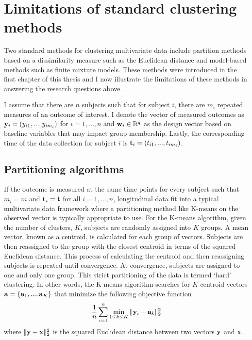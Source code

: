 \section{Limitations of standard clustering methods}
Two standard methods for clustering multivariate data include partition methods based on a dissimilarity measure such as the Euclidean distance and model-based methods such as finite mixture models. These methods were introduced in the first chapter of this thesis and I now illustrate the limitations of these methods in answering the research questions above. 

I assume that there are $n$ subjects such that for subject $i$, there are $m_{i}$ repeated measures of an outcome of interest. I denote the vector of measured outcomes as $\mathbf y_{i}=(y_{i1},...,y_{im_{i}})$ for $i=1,...,n$ and $\mathbf w_{i}\in \mathbb{R}^{q}$ as the design vector based on baseline variables that may impact group membership. Lastly, the corresponding time of the data collection for subject $i$ is $\mathbf t_{i}=(t_{i1},...,t_{im_{i}})$. 

\subsection{Partitioning algorithms}
If the outcome is measured at the same time points for every subject such that $m_{i}=m$ and $\mathbf t_{i}=\mathbf t$ for all $i=1,...,n$, longitudinal data fit into a typical multivariate data framework where a partitioning method like K-means \cite{macqueen1967, hartigan1979} on the observed vector is typically appropriate to use. For the K-means algorithm, given the number of clusters, $K$, subjects are randomly assigned into $K$ groups. A mean vector, known as a centroid, is calculated for each group of vectors. Subjects are then reassigned to the group with the closest centroid in terms of the squared Euclidean distance. This process of calculating the centroid and then reassigning subjects is repeated until convergence. At convergence, subjects are assigned to one and only one group. This strict partitioning of the data is termed `hard' clustering. In other words, the K-means algorithm searches for $K$ centroid vectors $\mathbf a=\{\mathbf a_{1}, ...,\mathbf a_{K}\}$ that minimize the following objective function
$$\frac{1}{n} \sum^{n}_{i=1}\min_{1\leq k\leq K}\|\mathbf  y_{i}-\mathbf a_{k}\|_{2}^{2}$$
where $\|\mathbf y - \mathbf x\|^{2}_{2}$ is the squared Euclidean distance between two vectors $\mathbf y$ and $\mathbf x$.

